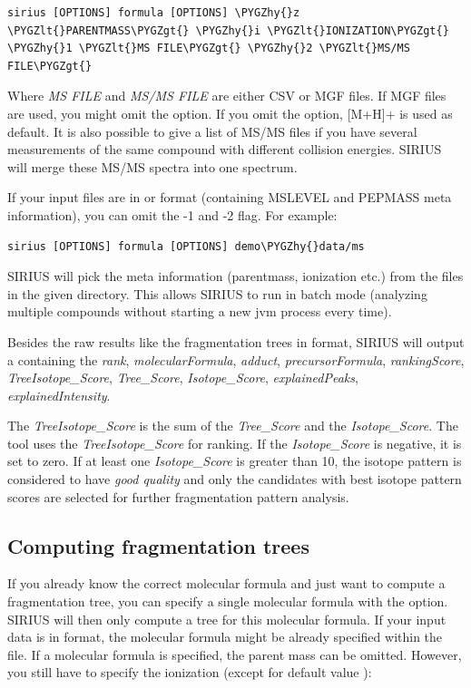 \documentclass[letterpaper,10pt,openany,oneside]{sphinxmanual}
\newcommand\gui[1]{\textsl{\guilsinglleft#1\guilsinglright\xspace}}
\def\PYGZlt{\char`\<}
\def\PYGZgt{\char`\>}
\def\PYGZhy{\char`\-}
\begin{document}
\begin{Verbatim}[commandchars=\\\{\}]
sirius [OPTIONS] formula [OPTIONS] \PYGZhy{}z \PYGZlt{}PARENTMASS\PYGZgt{} \PYGZhy{}i \PYGZlt{}IONIZATION\PYGZgt{} \PYGZhy{}1 \PYGZlt{}MS FILE\PYGZgt{} \PYGZhy{}2 \PYGZlt{}MS/MS FILE\PYGZgt{}
\end{Verbatim}

Where \gui{MS FILE} and \gui{MS/MS FILE} are either CSV or MGF files. If MGF files are used, you might omit the  option. If you omit the  option, {[}M+H{]}+ is used as default. It is also possible to give a list of MS/MS files if you have several measurements of the same compound with different collision energies. SIRIUS will merge these MS/MS spectra into one spectrum.

If your input files are in  or  format (containing MSLEVEL and PEPMASS meta information), you can omit the -1 and -2 flag. For example:

\begin{Verbatim}[commandchars=\\\{\}]
sirius [OPTIONS] formula [OPTIONS] demo\PYGZhy{}data/ms
\end{Verbatim}

SIRIUS will pick the meta information (parentmass, ionization etc.) from the  files in the given directory. This allows SIRIUS to run in batch mode (analyzing multiple compounds without starting a new jvm process every time).

Besides the raw results like the fragmentation trees in  format, SIRIUS will output a   containing the  
\gui{rank},	\gui{molecularFormula},	\gui{adduct}, \gui{precursorFormula},	\gui{rankingScore},	\gui{TreeIsotope\_Score},	\gui{Tree\_Score},	\gui{Isotope\_Score},	\gui{explainedPeaks},	\gui{explainedIntensity}.

The \gui{TreeIsotope\_Score} is the sum of the \gui{Tree\_Score} and the \gui{Isotope\_Score}. The  tool uses the \gui{TreeIsotope\_Score} for ranking. If the \gui{Isotope\_Score} is negative, it is set to zero. If at least one \gui{Isotope\_Score} is greater than 10, the isotope pattern is considered to have \emph{good quality} and only the candidates with best isotope pattern scores are selected for further fragmentation pattern analysis.


\subsection*{Computing fragmentation trees}
\label{commandline:computing-fragmentation-trees}
If you already know the correct molecular formula and just want to compute a
fragmentation tree, you can specify a single molecular formula with
the  option. SIRIUS will then only compute a tree for this
molecular formula. If your input data is in  format, the molecular
formula might be already specified within the file. If a molecular formula is
specified, the parent mass can be omitted. However, you still have to specify
the ionization (except for default value \code{{[}M+H{]}+}):
\end{document}
